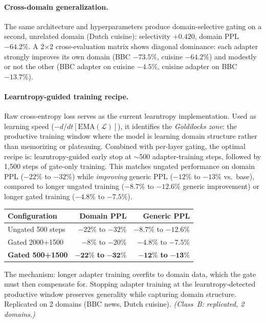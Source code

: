 \documentclass{article}
\begin{document}
\paragraph{Cross-domain generalization.}
The same architecture and hyperparameters produce domain-selective gating on a
second, unrelated domain (Dutch cuisine): selectivity $+0.420$, domain PPL
$-64.2\%$. A 2$\times$2 cross-evaluation matrix shows diagonal dominance:
each adapter strongly improves its own domain (BBC $-73.5\%$, cuisine $-64.2\%$)
and modestly or not the other (BBC adapter on cuisine $-4.5\%$, cuisine adapter
on BBC $-13.7\%$).

\paragraph{Learntropy-guided training recipe.}
Raw cross-entropy loss serves as the current learntropy implementation.
Used as learning speed ($-d/dt[\text{EMA}(\mathcal{L})]$), it identifies
the \emph{Goldilocks zone}: the productive training window where the
model is learning domain structure rather than memorizing or plateauing.
Combined with per-layer gating, the optimal recipe is: learntropy-guided
early stop at $\sim$500 adapter-training steps, followed by 1,500 steps
of gate-only training. This matches ungated performance on domain PPL
($-22\%$ to $-32\%$) while \emph{improving} generic PPL ($-12\%$ to
$-13\%$ vs.\ base), compared to longer ungated training ($-8.7\%$ to
$-12.6\%$ generic improvement) or longer gated training ($-4.8\%$ to
$-7.5\%$).

\begin{center}
\begin{tabular}{@{}lrr@{}}
\toprule
Configuration & Domain PPL & Generic PPL \\
\midrule
Ungated 500 steps & $-22\%$ to $-32\%$ & $-8.7\%$ to $-12.6\%$ \\
Gated 2000+1500 & $-8\%$ to $-20\%$ & $-4.8\%$ to $-7.5\%$ \\
\textbf{Gated 500+1500} & $\mathbf{-22\%}$ \textbf{to} $\mathbf{-32\%}$ & $\mathbf{-12\%}$ \textbf{to} $\mathbf{-13\%}$ \\
\bottomrule
\end{tabular}
\end{center}

\noindent The mechanism: longer adapter training overfits to domain data,
which the gate must then compensate for. Stopping adapter training at the
learntropy-detected productive window preserves generality while
capturing domain structure. Replicated on 2 domains (BBC news, Dutch
cuisine). \emph{(Class~B: replicated, 2 domains.)}
\end{document}
